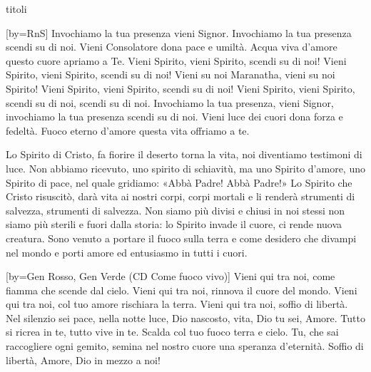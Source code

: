 \begin{songs}{titoli}

[by={RnS}]
\beginverse
Invochiamo la tua presenza vieni Signor.
Invochiamo la tua presenza scendi su di noi.
Vieni Consolatore dona pace e umiltà.
Acqua viva d'amore questo cuore apriamo a Te.
\endverse
\beginchorus
Vieni Spirito, vieni Spirito, scendi su di noi!
Vieni Spirito, vieni Spirito, scendi su di noi!
Vieni su noi Maranatha, vieni su noi Spirito!
Vieni Spirito, vieni Spirito, scendi su di noi!
Vieni Spirito, vieni Spirito, scendi su di noi, scendi su di noi.
\endchorus
\beginverse
Invochiamo la tua presenza, vieni Signor,
invochiamo la tua presenza scendi su di noi.
Vieni luce dei cuori dona forza e fedeltà.
Fuoco eterno d'amore questa vita offriamo a te.
\endverse
\endsong

\beginchorus
Lo Spirito di Cristo, fa fiorire il deserto
torna la vita,
noi diventiamo testimoni di luce.
\endchorus
\beginverse
Non abbiamo ricevuto, uno spirito di schiavitù,
ma uno Spirito d'amore, uno Spirito di pace,
nel quale gridiamo: «Abbà Padre! Abbà Padre!»
\endverse
\beginverse
Lo Spirito che Cristo risuscitò,
darà vita ai nostri corpi, corpi mortali
e li renderà strumenti di salvezza, strumenti di salvezza.
\endverse
\beginverse
Non siamo più divisi e chiusi in noi stessi
non siamo più sterili e fuori dalla storia:
lo Spirito invade il cuore, ci rende nuova creatura.
\endverse
\beginverse
Sono venuto a portare il fuoco sulla terra
e come desidero che divampi nel mondo
e porti amore ed entusiasmo in tutti i cuori.
\endverse
\endsong

[by={Gen Rosso, Gen Verde (CD Come fuoco vivo)}]
\beginchorus
Vieni qui tra noi, come fiamma che scende dal cielo.
Vieni qui tra noi, rinnova il cuore del mondo.
Vieni qui tra noi, col tuo amore rischiara la terra.
Vieni qui tra noi,
soffio di libertà.
\endchorus
\beginverse
Nel silenzio sei pace, nella notte luce,
Dio nascosto, vita, Dio tu sei, Amore.
Tutto si ricrea in te, tutto vive in te.
Scalda col tuo fuoco terra e cielo.
Tu, che sai raccogliere ogni gemito,
semina nel nostro cuore una speranza d'eternità.
\endverse
\beginverse*
Soffio di libertà,
Amore, Dio in mezzo a noi!
\endverse
\endsong


\end{songs}
